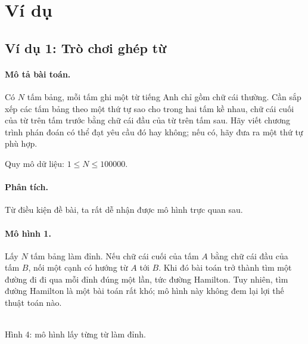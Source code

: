 \documentclass[11pt]{article}
\begin{document}
\section{Ví dụ}

\subsection{Ví dụ 1: Trò chơi ghép từ}

\paragraph{Mô tả bài toán.}
Có \(N\) tấm bảng, mỗi tấm ghi một từ tiếng Anh chỉ gồm chữ cái thường. Cần
sắp xếp các tấm bảng theo một thứ tự sao cho trong hai tấm kề nhau, chữ cái
cuối của từ trên tấm trước bằng chữ cái đầu của từ trên tấm sau. Hãy viết
chương trình phán đoán có thể đạt yêu cầu đó hay không; nếu có, hãy đưa ra một
thứ tự phù hợp.

Quy mô dữ liệu: \(1\le N\le 100000\).

\paragraph{Phân tích.}
Từ điều kiện đề bài, ta rất dễ nhận được mô hình trực quan sau.

\paragraph{Mô hình 1.}
Lấy \(N\) tấm bảng làm đỉnh. Nếu chữ cái cuối của tấm \(A\) bằng chữ cái đầu
của tấm \(B\), nối một cạnh có hướng từ \(A\) tới \(B\). Khi đó bài toán trở
thành tìm một đường đi đi qua mỗi đỉnh đúng một lần, tức đường Hamilton. Tuy
nhiên, tìm đường Hamilton là một bài toán rất khó; mô hình này không đem lại
lợi thế thuật toán nào.

\begin{center}
\\
\small Hình 4: mô hình lấy từng từ làm đỉnh.
\end{center}
\end{document}
